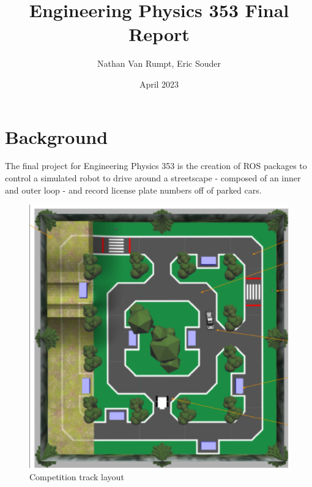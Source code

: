 \documentclass[titlepage, twocolumn]{article}
\newcommand{\subtitle}[1]{%
  \posttitle{%
    \par\end{center}
    \begin{center}\large#1\end{center}
    \vskip0.5em}%
}
\begin{document}
\title{Engineering Physics 353 Final Report}
\subtitle{Team 15}
\author{Nathan Van Rumpt, Eric Souder}
\date{April 2023}

\maketitle

\section{Background}

    The final project for Engineering Physics 353 is the creation of ROS packages to control a simulated robot to drive around a streetscape - composed of an inner and outer loop - and record license plate numbers off of parked cars. 
    
    \begin{figure}
    \centering
    \includegraphics[width=0.8\linewidth]{Competition Space.png}
    \caption{Competition track layout}
    \label{fig:compspace}
    \end{figure}
    
\end{document}
